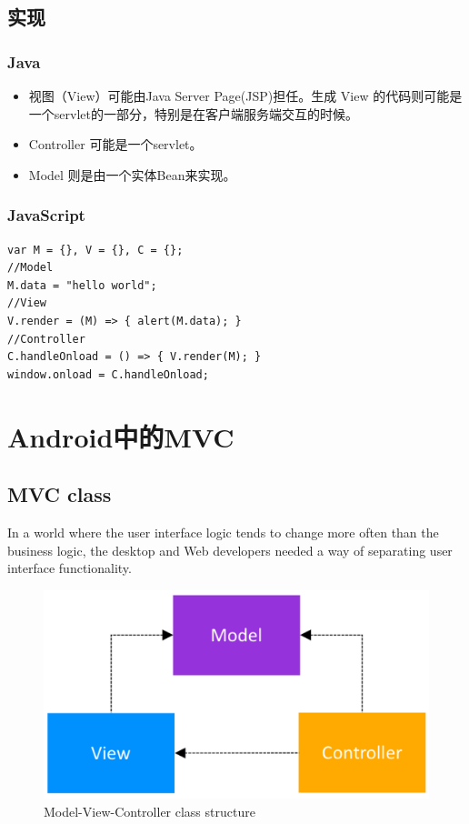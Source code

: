 \documentclass[a4paper,12pt]{ctexart}
\begin{document}
	\subsection{实现}
	\subsubsection{Java}
	\begin{itemize}
		\item 视图（View）可能由Java Server Page(JSP)担任。生成 View 的代码则可能是一个servlet的一部分，特别是在客户端服务端交互的时候。
		\item Controller 可能是一个servlet。
		\item Model 则是由一个实体Bean来实现。
	\end{itemize}
	\subsubsection{JavaScript}
	\begin{lstlisting}[morekeywords={var,data,render,handleOnload,onload}]
var M = {}, V = {}, C = {};
//Model
M.data = "hello world";
//View
V.render = (M) => { alert(M.data); }
//Controller
C.handleOnload = () => { V.render(M); }
window.onload = C.handleOnload;
	\end{lstlisting}
	\section{Android中的MVC}
	\subsection{MVC class}
	In a world where the user interface logic tends to change more often than the business logic, the desktop and Web developers needed a way of separating user interface functionality. 
	\begin{figure}[ht]
		\centering
		\includegraphics[width=\textwidth]{image/2.png}
		\caption{Model-View-Controller class structure}
	\end{figure}
\end{document}
